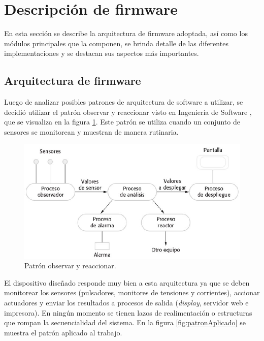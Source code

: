 \section{Descripción de firmware}

En esta sección se describe la arquitectura de firmware adoptada, así como los módulos principales que la componen, se brinda detalle de las diferentes implementaciones y se destacan sus aspectos más importantes.

\subsection{Arquitectura de firmware}
Luego de analizar posibles patrones de arquitectura de software a utilizar, se decidió utilizar el patrón observar y reaccionar visto en Ingeniería de Software \citep{INGSOFT}, que se visualiza en la figura \ref{fig:patron}. Este patrón se utiliza cuando un conjunto de sensores se monitorean y muestran de manera rutinaria.

\begin{figure}[htpb]
	\centering
	\includegraphics[scale=0.55]{./Figures/patron.png}
	\caption{Patrón observar y reaccionar.}
	\label{fig:patron}
\end{figure}

El dispositivo diseñado responde muy bien a esta arquitectura ya que se deben monitorear los sensores (pulsadores, monitores de tensiones y corrientes), accionar actuadores y enviar los resultados a procesos de salida (\textit{display}, servidor web e impresora). En ningún momento se tienen lazos de realimentación o estructuras que rompan la secuencialidad del sistema. En la figura \ref{fig:patronAplicado} se muestra el patrón aplicado al trabajo.

